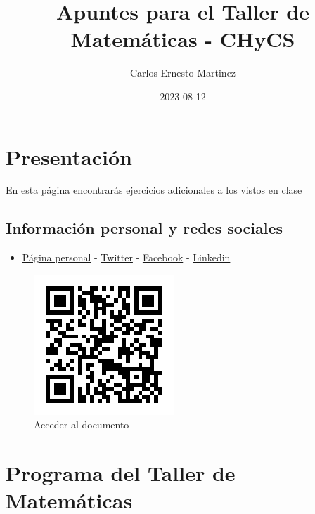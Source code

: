 \documentclass[]{book}
\title{Apuntes para el Taller de Matemáticas - CHyCS}
\author{Carlos Ernesto Martinez}
\date{2023-08-12}
\providecommand{\tightlist}{%
  \setlength{\itemsep}{0pt}\setlength{\parskip}{0pt}}
\begin{document}
\maketitle

{
\setcounter{tocdepth}{1}
\tableofcontents
}
\justify

\newpage

\thispagestyle{empty}

\chapter{Presentación}\label{presentaciuxf3n}

En esta página encontrarás ejercicios adicionales a los vistos en clase

\section{Información personal y redes
sociales}\label{informaciuxf3n-personal-y-redes-sociales}

\begin{itemize}
\tightlist
\item
  \href{https://directorioprofesores.uacm.edu.mx/profesor.html?key=2003080144}{Página
  personal} - \href{https://twitter.com/carlosmroder}{Twitter} -
  \href{https://www.facebook.com/TTodoMundo/}{Facebook} -
  \href{https://www.linkedin.com/in/carlos-martinez-r/}{Linkedin}
\end{itemize}

\begin{figure}
\centering
\includegraphics[width=2.08333in]{codigo_qr.png}
\caption{Acceder al documento}
\end{figure}

\chapter{Programa del Taller de
Matemáticas}\label{programa-del-taller-de-matemuxe1ticas}
\end{document}
